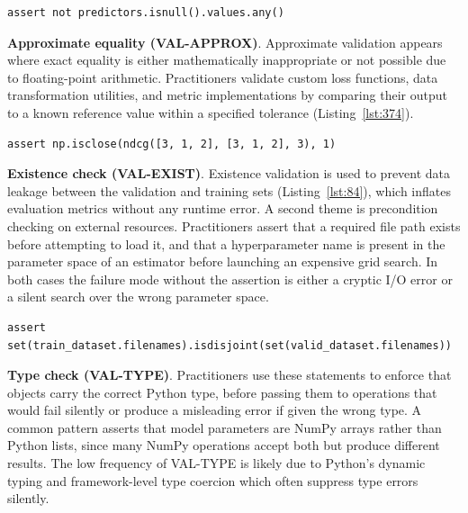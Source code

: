 \documentclass[a4paper,USenglish,cleveref,autoref,thm-restate,anonymous]{lipics-v2021}       %
\begin{document}
\begin{lstlisting}[caption={This assertion appears in a cardiovascular disease mortality pipeline
to prevent missing values from silently corrupting feature selection
or crashing estimators that assume complete data.}, label={lst:54}]
assert not predictors.isnull().values.any()
\end{lstlisting}

\textbf{Approximate equality (VAL-APPROX)}.
Approximate validation appears where exact equality is either mathematically inappropriate
or not possible due to floating-point arithmetic.
Practitioners validate custom loss functions,
data transformation utilities,
and metric implementations
by comparing their output to a known reference value
within a specified tolerance (Listing~\ref{lst:374}).

\begin{lstlisting}[caption={Validate that a custom NDCG implementation
returns a value close to 1.0
when predicted and true rankings are identical.}, label={lst:374}]
assert np.isclose(ndcg([3, 1, 2], [3, 1, 2], 3), 1)
\end{lstlisting}

\textbf{Existence check (VAL-EXIST)}.
Existence validation is used to prevent data leakage
between the validation and training sets (Listing~\ref{lst:84}),
which inflates evaluation metrics without any runtime error.
A second theme is precondition checking on external resources.
Practitioners assert that a required file path exists before attempting to load it,
and that a hyperparameter name is present in the parameter space of an estimator
before launching an expensive grid search.
In both cases the failure mode without the assertion
is either a cryptic I/O error
or a silent search over the wrong parameter space.

\begin{lstlisting}[caption={Verifies that training and validation sets are disjoint
before model fitting begins.}, label={lst:84}]
assert set(train_dataset.filenames).isdisjoint(set(valid_dataset.filenames))
\end{lstlisting}

\textbf{Type check (VAL-TYPE)}.
Practitioners use these statements to enforce
that objects carry the correct Python type,
before passing them to operations that would fail silently
or produce a misleading error if given the wrong type.
A common pattern asserts that model parameters are NumPy arrays rather than Python lists,
since many NumPy operations accept both
but produce different results.
The low frequency of VAL-TYPE is likely due to
Python's dynamic typing and framework-level type coercion
which often suppress type errors silently.
\end{document}
